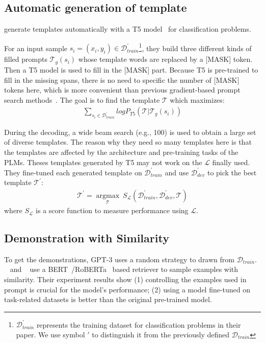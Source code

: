 \subsection{Automatic generation of template}\label{sec:agt}

\citet{DBLP:conf/acl/GaoFC20} generate templates automatically with a T5 model~\citep{DBLP:journals/jmlr/RaffelSRLNMZLL20} for classification problems. 

For an input sample $s_i=(x_i, y_i) \in \mathcal{D}_{train}^{'}$\footnote{ $\mathcal{D}_{train}^{'}$ represents the training dataset for classification problems in their paper. We use symbol $'$ to distinguish it from the previously defined $\mathcal{D}_{train}$}, they build three different kinds of filled prompts $\mathcal{T}_g (s_i)$ whose template words are replaced by a [MASK] token.
Then a T5 model is used to fill in the [MASK] part. Because T5 is pre-trained to fill in the missing spans, there is no need to specific the number of [MASK] tokens here, which is more convenient than previous gradient-based prompt search methods~\citep{DBLP:conf/emnlp/WallaceFKGS19,DBLP:conf/emnlp/ShinRLWS20}. The goal is to find the template $\mathcal{T}$ which maximizes:
\begin{align}
	\sum_{s_i\in\mathcal{D}_{train}^{'}}log P_{T5}(\mathcal{T} | \mathcal{T}_g (s_i))
	\label{eq:decodet_old}
\end{align}

During the decoding, a wide beam search (e.g., 100) is used to obtain a large set of diverse templates. The reason why they need so many templates here is that the templates are affected by the architecture and pre-training tasks of the PLMs. Theses templates generated by T5 may not work on the $\mathcal{L}$ finally used. They fine-tuned each generated template on $\mathcal{D}_{train}^{'}$ and use $\mathcal{D}_{dev}^{'}$ to pick the best template $\mathcal{T}^{'}$:
\begin{align}
	\mathcal{T}^{'}=\mathop{\arg\max}\limits_{\mathcal{T}}\ S_{\mathcal{L}}(\mathcal{D}_{train}^{'}, \mathcal{D}_{dev}^{'}, \mathcal{T})
	\label{eq:best_old}
\end{align}
where $S_{\mathcal{L}}$ is a score function to measure performance using $\mathcal{L}$.

\subsection{Demonstration with Similarity}\label{sec:staticd}
To get the demonstrations, GPT-3 uses a random strategy to drawn from $\mathcal{D}_{train}$.  ~\citet{DBLP:conf/acl/GaoFC20} and ~\citet{DBLP:journals/corr/abs-2101-06804} use a BERT~\citep{DBLP:conf/naacl/DevlinCLT19}/RoBERTa~\citep{DBLP:journals/corr/abs-1907-11692} based retriever to sample examples with similarity. Their experiment results show (1) controlling the examples used in prompt is crucial for the model's performance; (2) using a model fine-tuned on task-related datasets is better than the original pre-trained
model.

